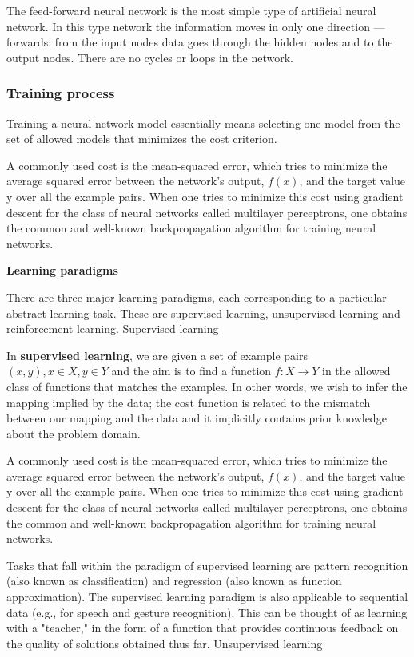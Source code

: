 \documentclass[a4paper,12pt]{article}
\begin{document}

The feed-forward neural network is the most simple type of artificial neural network. In this type network the information moves in only one direction — forwards: from the input nodes data goes through the hidden nodes and to the output nodes. There are no cycles or loops in the network.

\subsubsection{Training process}

Training a neural network model essentially means selecting one model from the set of allowed models that minimizes the cost criterion.

A commonly used cost is the mean-squared error, which tries to minimize the average squared error between the network's output, $f(x)$, and the target value y over all the example pairs. When one tries to minimize this cost using gradient descent for the class of neural networks called multilayer perceptrons, one obtains the common and well-known backpropagation algorithm for training neural networks.

\textbf{Learning paradigms}

There are three major learning paradigms, each corresponding to a particular abstract learning task. These are supervised learning, unsupervised learning and reinforcement learning.
Supervised learning

In \textbf{supervised learning}, we are given a set of example pairs $ (x, y), x \in X, y \in Y $ and the aim is to find a function $ f : X \rightarrow Y $ in the allowed class of functions that matches the examples. In other words, we wish to infer the mapping implied by the data; the cost function is related to the mismatch between our mapping and the data and it implicitly contains prior knowledge about the problem domain.

A commonly used cost is the mean-squared error, which tries to minimize the average squared error between the network's output, $f(x)$, and the target value y over all the example pairs. When one tries to minimize this cost using gradient descent for the class of neural networks called multilayer perceptrons, one obtains the common and well-known backpropagation algorithm for training neural networks.

Tasks that fall within the paradigm of supervised learning are pattern recognition (also known as classification) and regression (also known as function approximation). The supervised learning paradigm is also applicable to sequential data (e.g., for speech and gesture recognition). This can be thought of as learning with a "teacher," in the form of a function that provides continuous feedback on the quality of solutions obtained thus far.
Unsupervised learning
\end{document}
